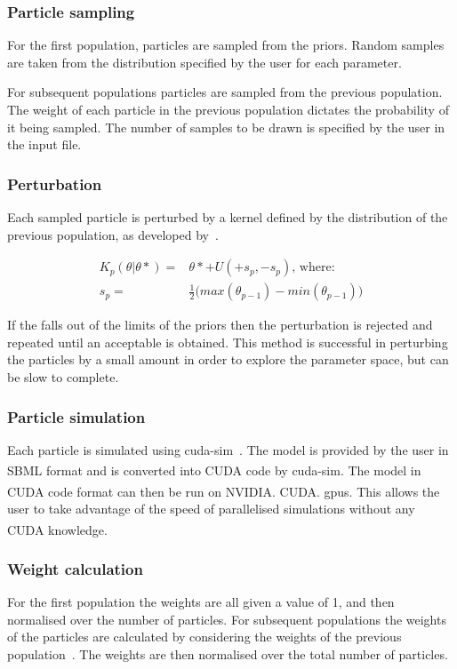 \subsubsection{Particle sampling}
\label{sec:part_samp}
For the first population, particles are sampled from the priors. Random samples are taken from the distribution specified by the user for each parameter. 

For subsequent populations particles are sampled from the previous population. The weight of each particle in the previous population dictates the probability of it being sampled. The number of samples to be drawn is specified by the user in the input file.  

\subsubsection{Perturbation}
\label{sec:pertub}
Each sampled particle is perturbed by a kernel defined by the distribution of the previous population, as developed by~\textcite{Toni:2009tr}. 

\begin{align}
K_p(\theta|\theta* ) =& \theta* + U(+s_p, -s_p)\text{, where:} \\
s_p =& \frac{1}{2} \big (max(\theta_{p-1}) - min(\theta_{p-1}) \big )
\end{align}

If the \texttheta* falls out of the limits of the priors then the perturbation is rejected and repeated until an acceptable \texttheta* is obtained. This method is successful in perturbing the particles by a small amount in order to explore the parameter space, but can be slow to complete. 

\subsubsection{Particle simulation}
\label{sec:sim}
Each particle is simulated using cuda-sim~\autocite{Zhou:2011hp}. The model is provided by the user in SBML format and is converted into CUDA\textsuperscript{\textregistered} code by cuda-sim. The model in CUDA\textsuperscript{\textregistered} code format can then be run on NVIDIA\textsuperscript{\textregistered}. CUDA\textsuperscript{\textregistered}. \acrshort{gpu}s. This allows the user to take advantage of the speed of parallelised simulations without any CUDA\textsuperscript{\textregistered} knowledge. 


\subsubsection{Weight calculation}
\label{sec:weight}
For the first population the weights are all given a value of 1, and then normalised over the number of particles. For subsequent populations the weights of the particles are calculated by considering the weights of the previous population~\autocite{Toni:2009tr}. The weights are then normalised over the total number of particles. 


